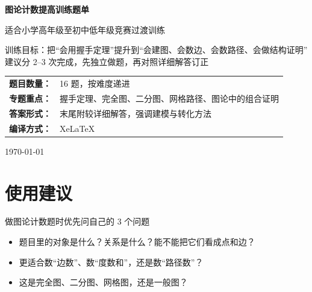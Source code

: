 \documentclass[11pt,a4paper,fontset=fandol]{ctexart}
\theoremstyle{formalexample}
\begin{document}
\thispagestyle{empty}
\begin{titlepage}
\centering
\vspace*{0.9cm}
\begin{tcolorbox}[
  enhanced,
  width=0.92\textwidth,
  colback=white,
  colframe=mainblue,
  boxrule=1pt,
  arc=0mm,
  left=6mm,
  right=6mm,
  top=8mm,
  bottom=8mm
]
\centering
{\fontsize{24}{30}\selectfont\bfseries 图论计数提高训练题单\par}
\vspace{0.6cm}
{\fontsize{17}{22}\selectfont 适合小学高年级至初中低年级竞赛过渡训练\par}

\vspace{1cm}
\begin{tcolorbox}[colback=lightblue,colframe=mainblue,width=0.84\textwidth,boxrule=1pt]
\centering
{\large 训练目标：把“会用握手定理”提升到“会建图、会数边、会数路径、会做结构证明”}\\[0.35em]
{\normalsize 建议分 2--3 次完成，先独立做题，再对照详细解答订正}
\end{tcolorbox}

\vspace{1cm}
\renewcommand{\arraystretch}{1.42}
\begin{tabular}{>{\bfseries}p{3.5cm}p{8cm}}
题目数量： & 16 题，按难度递进 \\
专题重点： & 握手定理、完全图、二分图、网格路径、图论中的组合证明 \\
答案形式： & 末尾附较详细解答，强调建模与转化方法 \\
编译方式： & XeLaTeX \\
\end{tabular}

\vspace{0.9cm}
{\large \today\par}
\end{tcolorbox}
\end{titlepage}

\tableofcontents
\newpage

\section{使用建议}

\begin{goalbox}{做图论计数题时优先问自己的 3 个问题}
\begin{itemize}
  \item 题目里的对象是什么？关系是什么？能不能把它们看成点和边？
  \item 更适合数“边数”、数“度数和”，还是数“路径数”？
  \item 这是完全图、二分图、网格图，还是一般图？
\end{itemize}
\end{goalbox}
\end{document}
